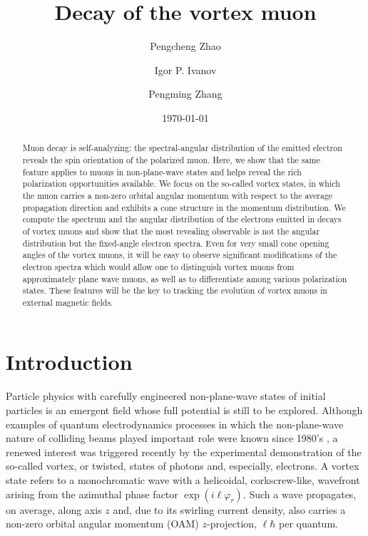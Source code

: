 \documentclass[aps,prd,longbibliography,nofootinbib,amsthm,amsmath,amssymb,amsfonts,notitlepage]{revtex4-1}
\date{\today}
\begin{document}
\title{Decay of the vortex muon}
\author{Pengcheng Zhao}
\author{Igor P. Ivanov}
\author{Pengming Zhang}

\begin{abstract}
Muon decay is self-analyzing: the spectral-angular distribution of the emitted electron reveals the spin orientation of the polarized muon.
Here, we show that the same feature applies to muons in non-plane-wave states and helps reveal the rich polarization opportunities available.
We focus on the so-called vortex states, in which the muon carries a non-zero orbital angular momentum with respect to the average propagation direction
and exhibits a cone structure in the momentum distribution.
We compute the spectrum and the angular distribution of the electrons emitted in decays of vortex muons and show that the most revealing
observable is not the angular distribution but the fixed-angle electron spectra.
Even for very small cone opening angles of the vortex muons, it will be easy to observe significant modifications of the electron spectra
which would allow one to distinguish vortex muons from approximately plane wave muons, as well as to differentiate among various polarization states.
These features will be the key to tracking the evolution of vortex muons in external magnetic fields.
\end{abstract}

\maketitle

\section{Introduction}

Particle physics with carefully engineered non-plane-wave states of initial particles is an emergent field
whose full potential is still to be explored.
Although examples of quantum electrodynamics processes in which the non-plane-wave nature
of colliding beams played important role were known since 1980's \cite{Blinov:1982vp,Kotkin:1992bj,Kotkin:2003jz},
a renewed interest was triggered recently by the experimental demonstration
of the so-called vortex, or twisted, states of photons and, especially, electrons.
A vortex state refers to a monochromatic wave with a helicoidal, corkscrew-like, wavefront
arising from the azimuthal phase factor $\exp(i\ell \varphi_r)$.
Such a wave propagates, on average, along axis $z$ and, due to its swirling current density,
also carries a non-zero orbital angular momentum (OAM) $z$-projection, $\ell\hbar$ per quantum.
\end{document}
